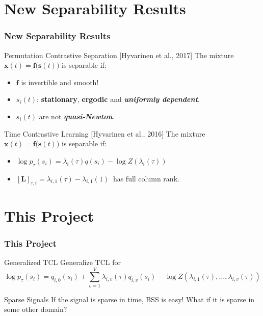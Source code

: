 \documentclass[usenames,dvipsnames]{beamer}
\begin{document}
\section{New Separability Results}
\begin{frame}
\frametitle{New Separability Results}
	\begin{alertblock}{Permutation Contrastive Separation [\footnotesize{Hyvarinen et al., 2017}]}
The mixture
		$\textbf{x}(t) = \textbf{f}\big(\textbf{s}(t)\big)$ is separable if:
		\begin{itemize}
			\item
			$\textbf{f}$ is invertible and smooth!
			\item
			$s_i(t)$:  \textbf{stationary},  \textbf{ergodic} and  \textbf{ \textit{uniformly dependent}}.
			\item
			$s_i(t)$ are not \textbf{ \textit{quasi-Newton}}.		
		\end{itemize}
	\end{alertblock}
\pause
	\begin{block}{Time Contrastive Learning \footnotesize[{Hyvarinen et al., 2016}]}
The mixture
$\textbf{x}(t) = \textbf{f}\big(\textbf{s}(t)\big)$ is separable if:
\begin{itemize}
\item
$
	\log p_\tau(s_i)=    \lambda_{i}(\tau) q(s_i) - \log Z( \lambda_{i}(\tau))
	\label{eq:p_tau_simple}
$
\item
$[\mathbf{L}]_{\tau, i} = 
	\lambda_{i, 1}(\tau) - \lambda_{i, 1}(1) \
	$
	has full column rank.
\end{itemize}
\end{block}
\end{frame}

\section{This Project}
\begin{frame}
\frametitle{This Project}

\begin{block}{Generalized TCL}
Generalize TCL for $$
	\log p_\tau(s_i)=  q_{i,0}(s_i) + \sum_{v=1}^V \lambda_{i,v}(\tau) q_{i,v}(s_i) - \log Z( \lambda_{i,1}(\tau),\ldots,\lambda_{i,v}(\tau))$$
\end{block}

\pause
\begin{alertblock}{Sparse Signals}
	If the signal is sparse in time, BSS is easy! What if it is sparse in some other domain?
\end{alertblock}

\end{frame}
\end{document}
